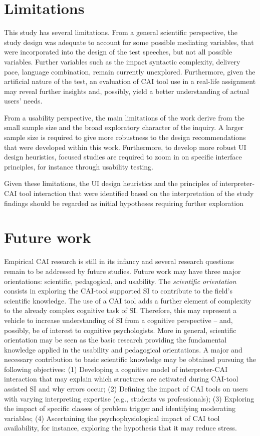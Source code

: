 \section{Limitations}

This study has several limitations. From a general scientific perspective, the study design was adequate to account for some possible mediating variables, that were incorporated into the design of the test speeches, but not all possible variables. Further variables such as the impact syntactic complexity, delivery pace, language combination, remain currently unexplored. Furthermore, given the artificial nature of the test, an evaluation of CAI tool use in a real-life assignment may reveal further insights and, possibly, yield a better understanding of actual users’ needs.


From a usability perspective, the main limitations of the work derive from the small sample size and the broad exploratory character of the inquiry. A larger sample size is required to give more robustness to the design recommendations that were developed within this work. Furthermore, to develop more robust UI design heuristics, focused studies are required to zoom in on specific interface principles, for instance through usability testing.

Given these limitations, the UI design heuristics and the principles of in\-ter\-pret\-er-CAI tool interaction that were identified based on the interpretation of the study findings should be regarded as initial hypotheses requiring further exploration



\section{Future work}

Empirical CAI research is still in its infancy and several research questions remain to be addressed by future studies. Future work may have three major orientations: scientific, pedagogical, and usability. The \textit{scientific orientation} consists in exploring the CAI-tool supported SI to contribute to the field’s scientific knowledge. The use of a CAI tool adds a further element of complexity to the already complex cognitive task of SI. Therefore, this may represent a vehicle to increase understanding of SI from a cognitive perspective -- and, possibly, be of interest to cognitive psychologists. More in general, scientific orientation may be seen as the basic research providing the fundamental knowledge applied in the usability and pedagogical orientations. A major and necessary contribution to basic scientific knowledge may be obtained pursuing the following objectives: (1) Developing a cognitive model of interpreter-CAI interaction that may explain which structures are activated during CAI-tool assisted SI and why errors occur; (2) Defining the impact of CAI tools on users with varying interpreting expertise (e.g., students vs professionals); (3) Exploring the impact of specific classes of problem trigger and identifying moderating variables; (4) Ascertaining the psychophysiological impact of CAI tool availability, for instance, exploring the hypothesis that it may reduce stress.

